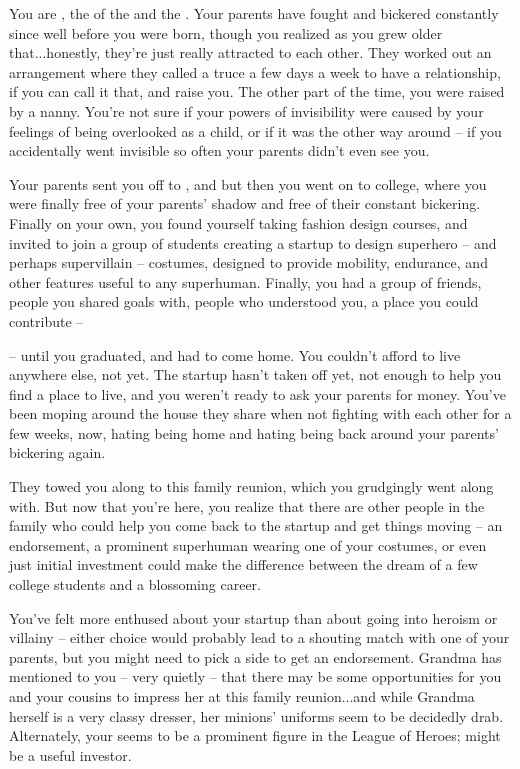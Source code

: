 \documentclass[char]{LRSguildcamp1}
\begin{document}
\name{\cGrad{}}
You are \cGrad{\intro}, the \cGrad{\offspring} of the \cOldest{\villain} \cOldest{\intro} and the \cOS{\hero} \cOS{\intro}.  Your parents have fought and bickered constantly since well before you were born, though you realized as you grew older that...honestly, they're just really attracted to each other.  They worked out an arrangement where they called a truce a few days a week to have a relationship, if you can call it that, and raise you.  The other part of the time, you were raised by a nanny.  You're not sure if your powers of invisibility were caused by your feelings of being overlooked as a child, or if it was the other way around -- if you accidentally went invisible so often your parents didn't even see you.  

Your parents sent you off to \pSuperSchool{}, and but then you went on to college, where you were finally free of your parents' shadow and free of their constant bickering.  Finally on your own, you found yourself taking fashion design courses, and invited to join a group of students creating a startup to design superhero -- and perhaps supervillain -- costumes, designed to provide mobility, endurance, and other features useful to any superhuman.  Finally, you had a group of friends, people you shared goals with, people who understood you, a place you could contribute --

-- until you graduated, and had to come home.  You couldn't afford to live anywhere else, not yet.  The startup hasn't taken off yet, not enough to help you find a place to live, and you weren't ready to ask your parents for money.  You've been moping around the house they share when not fighting with each other for a few weeks, now, hating being home and hating being back around your parents' bickering again.

They towed you along to this family reunion, which you grudgingly went along with.  But now that you're here, you realize that there are other people in the family who could help you come back to the startup and get things moving -- an endorsement, a prominent superhuman wearing one of your costumes, or even just initial investment could make the difference between the dream of a few college students and a blossoming career.

You've felt more enthused about your startup than about going into heroism or villainy -- either choice would probably lead to a shouting match with one of your parents, but you might need to pick a side to get an endorsement.  Grandma has mentioned to you -- very quietly -- that there may be some opportunities for you and your cousins to impress her at this family reunion...and while Grandma herself is a very classy dresser, her minions' uniforms seem to be decidedly drab.  Alternately, your \cYoungest{\uncle} \cYoungest{} seems to be a prominent figure in the League of Heroes; \cYoungest{\they} might be a useful investor.
\end{document}
